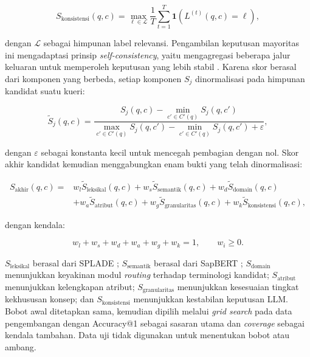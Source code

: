 \begin{equation}
S_{\mathrm{konsistensi}}(q,c)=
\max_{\ell\in\mathcal{L}}
\frac{1}{T}\sum_{t=1}^{T}
\mathbf{1}\!\left(L^{(t)}(q,c)=\ell\right),
\label{eq:reranking-self-consistency}
\end{equation}

dengan $\mathcal{L}$ sebagai himpunan label relevansi. Pengambilan keputusan mayoritas ini mengadaptasi prinsip \textit{self-consistency}, yaitu mengagregasi beberapa jalur keluaran untuk memperoleh keputusan yang lebih stabil \citep{wang_self-consistency_2023}. Karena skor berasal dari komponen yang berbeda, setiap komponen $S_j$ dinormalisasi pada himpunan kandidat suatu kueri:

\begin{equation}
\widetilde{S}_{j}(q,c)=
\frac{S_j(q,c)-\min_{c'\in C'(q)}S_j(q,c')}
{\max_{c'\in C'(q)}S_j(q,c')-\min_{c'\in C'(q)}S_j(q,c')+\varepsilon},
\label{eq:score-normalization}
\end{equation}

dengan $\varepsilon$ sebagai konstanta kecil untuk mencegah pembagian dengan nol. Skor akhir kandidat kemudian menggabungkan enam bukti yang telah dinormalisasi:

\begin{equation}
\begin{split}
S_{\mathrm{akhir}}(q,c)={}&
w_l\widetilde{S}_{\mathrm{leksikal}}(q,c)
+w_s\widetilde{S}_{\mathrm{semantik}}(q,c)
+w_d\widetilde{S}_{\mathrm{domain}}(q,c)\\
&+w_a\widetilde{S}_{\mathrm{atribut}}(q,c)
+w_g\widetilde{S}_{\mathrm{granularitas}}(q,c)
+w_k\widetilde{S}_{\mathrm{konsistensi}}(q,c),
\end{split}
\label{eq:final-mapping-score}
\end{equation}

dengan kendala:

\begin{equation}
w_l+w_s+w_d+w_a+w_g+w_k=1,
\qquad w_i\geq0.
\label{eq:score-weight-constraint}
\end{equation}

$S_{\mathrm{leksikal}}$ berasal dari SPLADE \citep{formal_splade_2021}; $S_{\mathrm{semantik}}$ berasal dari SapBERT \citep{liu_self-alignment_2021}; $S_{\mathrm{domain}}$ menunjukkan keyakinan modul \textit{routing} terhadap terminologi kandidat; $S_{\mathrm{atribut}}$ menunjukkan kelengkapan atribut; $S_{\mathrm{granularitas}}$ menunjukkan kesesuaian tingkat kekhususan konsep; dan $S_{\mathrm{konsistensi}}$ menunjukkan kestabilan keputusan LLM. Bobot awal ditetapkan sama, kemudian dipilih melalui \textit{grid search} pada data pengembangan dengan Accuracy@1 sebagai sasaran utama dan \textit{coverage} sebagai kendala tambahan. Data uji tidak digunakan untuk menentukan bobot atau ambang.

